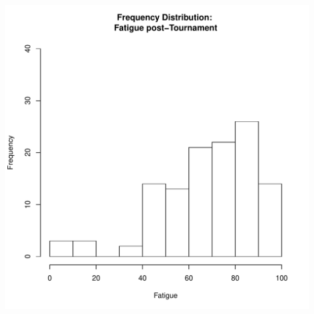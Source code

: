 \documentclass[12pt]{report}
\begin{document}
\includegraphics[scale =.4]{../images/distFatiguePost.pdf}
\end{document}
